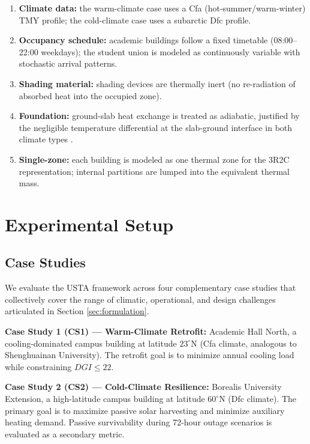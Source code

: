 \documentclass[preprint,12pt]{elsarticle}
\begin{document}
\begin{enumerate}
\item \textbf{Climate data:} the warm-climate case uses a Cfa (hot-summer/warm-winter) TMY profile; the cold-climate case uses a subarctic Dfc profile.

\item \textbf{Occupancy schedule:} academic buildings follow a fixed timetable (08:00--22:00 weekdays); the student union is modeled as continuously variable with stochastic arrival patterns.

\item \textbf{Shading material:} shading devices are thermally inert (no re-radiation of absorbed heat into the occupied zone).

\item \textbf{Foundation:} ground-slab heat exchange is treated as adiabatic, justified by the negligible temperature differential at the slab-ground interface in both climate types \cite{lauster2014}.

\item \textbf{Single-zone:} each building is modeled as one thermal zone for the 3R2C representation; internal partitions are lumped into the equivalent thermal mass.
\end{enumerate}

\section{Experimental Setup}
\label{sec:setup}

\subsection{Case Studies}

We evaluate the USTA framework across four complementary case studies that collectively cover the range of climatic, operational, and design challenges articulated in Section \ref{sec:formulation}.

\textbf{Case Study 1 (CS1) --- Warm-Climate Retrofit:} Academic Hall North, a cooling-dominated campus building at latitude $23^\circ$N (Cfa climate, analogous to Shenghuainan University). The retrofit goal is to minimize annual cooling load while constraining $DGI \leq 22$.

\textbf{Case Study 2 (CS2) --- Cold-Climate Resilience:} Borealis University Extension, a high-latitude campus building at latitude $60^\circ$N (Dfc climate). The primary goal is to maximize passive solar harvesting and minimize auxiliary heating demand. Passive survivability during 72-hour outage scenarios is evaluated as a secondary metric.
\end{document}
